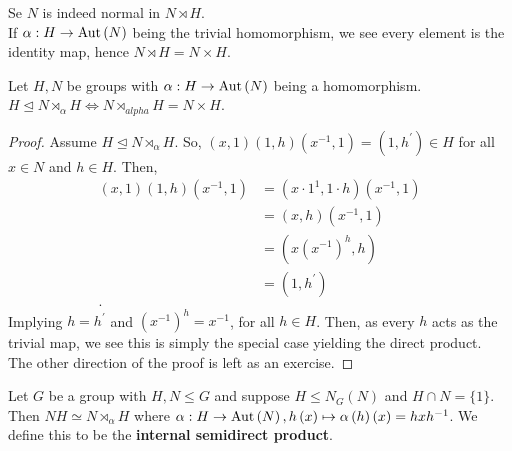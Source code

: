 Se \(N\) is indeed normal in \(N \rtimes H\).\\
If \(\alpha : H \to \operatorname{Aut} \left( N \right) \) being the trivial homomorphism, we see every element is the identity map, hence \(N \rtimes H =  N \times H\).
\begin{theorem}
	Let \(H, N\) be groups with \(\alpha : H \to \operatorname{Aut} \left( N \right) \) being a homomorphism. \(H \trianglelefteq N \rtimes_{\alpha} H \iff N \rtimes_{alpha} H = N \times H\).
\end{theorem}
\begin{proof}
	Assume \(H \trianglelefteq N \rtimes_{\alpha} H\). So, \(\left( x, 1 \right) \left( 1, h \right) \left( x^{-1}, 1 \right)  = \left( 1, h^{\prime} \right) \in H\) for all \(x \in N\) and \(h \in H\). Then,
	\begin{align*}
		\left( x, 1 \right) \left( 1, h \right) \left( x^{-1}, 1 \right)  &=  \left( x\cdot 1^{1}, 1 \cdot h \right) \left( x^{-1}, 1 \right)   \\
										  &= \left( x, h \right) \left( x^{-1}, 1 \right)   \\
										  &= \left( x\left( x^{-1} \right) ^{h}, h \right)  \\
										  &= \left( 1, h^{\prime} \right)  \\
	.\end{align*}
	Implying \(h = h^{\prime}\) and \(\left( x^{-1} \right) ^{h} = x^{-1}\), for all \(h \in H\). Then, as every \(h\) acts as the trivial map, we see this is simply the special case yielding the direct product.\\
	The other direction of the proof is left as an exercise.
\end{proof}
\begin{definition}
	Let \(G \) 	 be a group with \(H, N \le G\) and suppose \(H \le N_{G}\left( N \right) \) and \(H \cap N = \{1\} \). Then \(NH \simeq N \rtimes_{\alpha} H\) where \(\alpha: H \to \operatorname{Aut} \left( N \right) , h \left( x \right)  \mapsto \alpha \left( h \right)  \left( x \right)  = hxh^{-1}\). We define this to be the \textbf{internal semidirect product}.
\end{definition}
